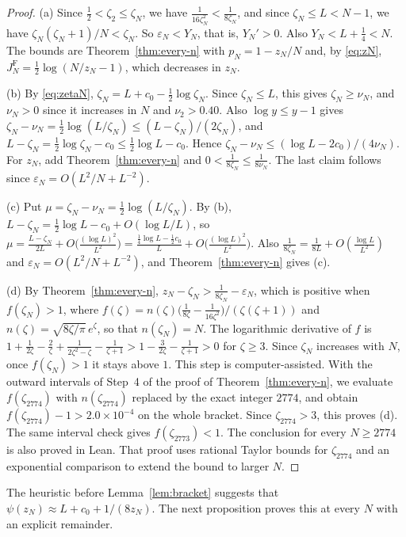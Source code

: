 \begin{proof}
(a) Since $\frac12<\zeta_2\le\zeta_N$, we have $\frac1{16\zeta_N^2}<\frac1{8\zeta_N}$, and
since $\zeta_N\le L<N-1$, we have $\zeta_N(\zeta_N+1)/N<\zeta_N$. So
$\varepsilon_N<Y_N$, that is, $Y_N'>0$. Also $Y_N<L+\frac14<N$. The bounds are
Theorem~\ref{thm:every-n} with $p_N=1-z_N/N$ and, by \eqref{eq:zN},
$J_N^{\mathrm F}=\frac12\log(N/z_N-1)$, which decreases in $z_N$.

(b) By \eqref{eq:zetaN}, $\zeta_N=L+c_0-\frac12\log\zeta_N$. Since
$\zeta_N\le L$, this gives $\zeta_N\ge\nu_N$, and $\nu_N>0$ since it increases
in $N$ and $\nu_2>0.40$. Also $\log y\le y-1$ gives
$\zeta_N-\nu_N=\frac12\log(L/\zeta_N)\le(L-\zeta_N)/(2\zeta_N)$, and
$L-\zeta_N=\frac12\log\zeta_N-c_0\le\frac12\log L-c_0$. Hence
$\zeta_N-\nu_N\le(\log L-2c_0)/(4\nu_N)$. For $z_N$, add
Theorem~\ref{thm:every-n} and $0<\frac1{8\zeta_N}\le\frac1{8\nu_N}$. The last
claim follows since $\varepsilon_N=O(L^2/N+L^{-2})$.

(c) Put $\mu=\zeta_N-\nu_N=\frac12\log(L/\zeta_N)$. By (b),
$L-\zeta_N=\frac12\log L-c_0+O(\log L/L)$, so
$\mu=\frac{L-\zeta_N}{2L}+O\bigl(\frac{(\log L)^2}{L^2}\bigr)
=\frac{\frac14\log L-\frac12c_0}L+O\bigl(\frac{(\log L)^2}{L^2}\bigr)$.
Also $\frac1{8\zeta_N}=\frac1{8L}+O(\frac{\log L}{L^2})$ and
$\varepsilon_N=O(L^2/N+L^{-2})$, and Theorem~\ref{thm:every-n} gives (c).

(d) By Theorem~\ref{thm:every-n}, $z_N-\zeta_N>\frac1{8\zeta_N}-\varepsilon_N$,
which is positive when $f(\zeta_N)>1$, where
$f(\zeta)=n(\zeta)\bigl(\frac1{8\zeta}-\frac1{16\zeta^2}\bigr)/(\zeta(\zeta+1))$
and $n(\zeta)=\sqrt{8\zeta/\pi}\,e^\zeta$, so that $n(\zeta_N)=N$. The
logarithmic derivative of $f$ is
$1+\frac1{2\zeta}-\frac2\zeta+\frac1{2\zeta^2-\zeta}-\frac1{\zeta+1}>1-\frac3{2\zeta}-\frac1{\zeta+1}>0$
for $\zeta\ge3$. Since $\zeta_N$ increases with $N$, once $f(\zeta_N)>1$ it
stays above $1$. This step is computer-assisted. With the outward intervals
of Step~4 of the proof of Theorem~\ref{thm:every-n}, we evaluate
$f(\zeta_{2774})$ with $n(\zeta_{2774})$ replaced by the exact integer $2774$,
and obtain $f(\zeta_{2774})-1>2.0\times10^{-4}$ on the whole bracket. Since $\zeta_{2774}>3$, this proves (d). The same interval
check gives $f(\zeta_{2773})<1$.
The conclusion for every $N\ge2774$ is also proved in Lean. That proof uses
rational Taylor bounds for $\zeta_{2774}$ and an exponential comparison
to extend the bound to larger $N$.
\end{proof}

The heuristic before Lemma~\ref{lem:bracket} suggests that $\psi(z_N)\approx L+c_0+1/(8z_N)$. The next
proposition proves this at every $N$ with an explicit remainder.

